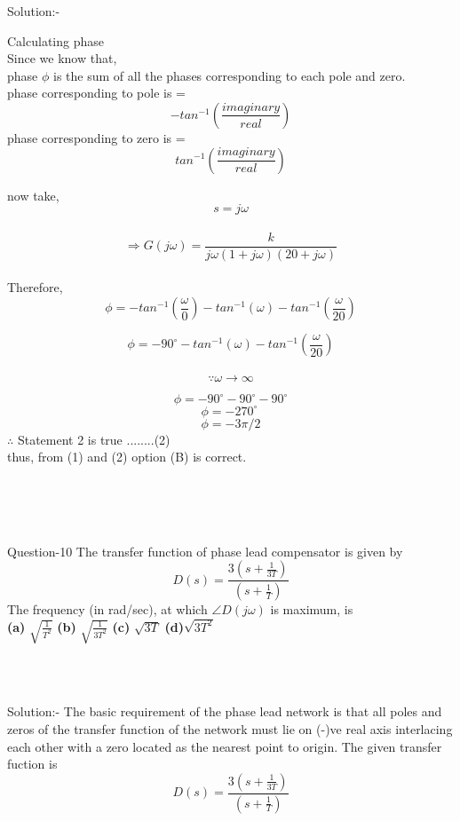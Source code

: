 \documentclass[journal,12pt,twocolumn]{IEEEtran}
\begin{document}
\begin{frame}{Solution:- }
\begin{frame}{}
Calculating phase\\
Since we know that,\\
phase $ \phi $ is the sum of all the phases corresponding to each pole and zero.\\
phase corresponding to pole is = \[ - tan^{-1}( \frac{imaginary}{real}) \]
phase corresponding to zero is = \[tan^{-1}( \frac{imaginary}{real})\]

\end{frame}



now take,\[  s = j\omega  \]\\

 \[ \Rightarrow  G(j\omega) =  \frac{k}{j\omega(1+j\omega)(20+j\omega)}\]
 \\
Therefore, \\
 \[  \phi =  -tan^{-1}( {\frac{\omega}{0}}) - tan^{-1}(\omega) - tan^{-1}( \frac{\omega}{20})\]

  \[ \phi =  - 90^\circ - tan^{-1}(\omega) - tan^{-1}( \frac{\omega}{20})\]
  \\
  \[\because \omega \to \infty\] 


 
 \begin{frame}{}
  \[ \phi =   - 90^\circ - 90^\circ - 90^\circ\]
 \[\phi = -270^\circ\ \]
 \[\phi = -3\pi/2 \] 
\quad \quad \quad $\therefore$ Statement 2 is true \quad \quad \quad \quad ........(2)\\
 thus, from (1) and (2) option (B) is correct.
\end{frame}
\\\\\\
\begin{frame}{Question-10 }
The transfer function of phase lead compensator is given by $$D(s) = \frac{3(s+\frac{1}{3T})}{(s+\frac{1}{T})}$$ 
The frequency (in rad/sec), at which $\angle D(j\omega)$ is maximum, is \\
\setlength{\lineskip}{1em}
\textbf{(a)} $\sqrt{\frac{1}{T^2}}$ \;\;\;\;\;\; \textbf{(b)} $\sqrt{\frac{1}{3T^2}}$ \;\;\;\;\;\; \textbf{(c)} $\sqrt{3T}$ \;\;\;\;\;\; \textbf{(d)}$\sqrt{3T^2}$
\end{frame}
\\\\
\begin{frame}{Solution:- }
 The basic requirement of the phase lead network is that all poles and zeros of the transfer function of the network must lie on (-)ve real axis interlacing each other with a zero located as the nearest point to origin.
   \newline
   \newline
 The given transfer fuction is $$D(s) = \frac{3(s+\frac{1}{3T})}{(s+\frac{1}{T})}$$
\end{frame}


\end{frame}
\end{document}
